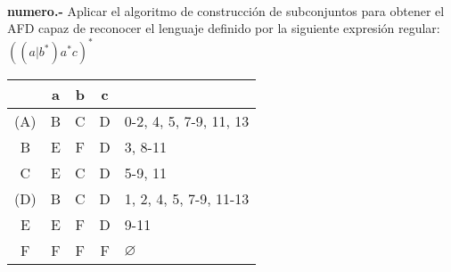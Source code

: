 \paragraph{}
\textbf{{numero}.-} Aplicar el algoritmo de construcción de subconjuntos para obtener el AFD capaz de reconocer el lenguaje definido por la siguiente expresión regular: \textbf{$ ((a|b^*)a^*c)^* $} \\

\begin{tabular} {| c | c |c |c | l |}
\hline 
& a & b & c & \\ \hline
(A) & B & C & D & 0-2, 4, 5, 7-9, 11, 13\\ \hline
B & E & F & D & 3, 8-11\\ \hline
C & E & C & D & 5-9, 11\\ \hline
(D) & B & C & D & 1, 2, 4, 5, 7-9, 11-13\\ \hline
E & E & F & D & 9-11\\ \hline
F & F & F & F & $\varnothing$\\ \hline
\end{tabular}
